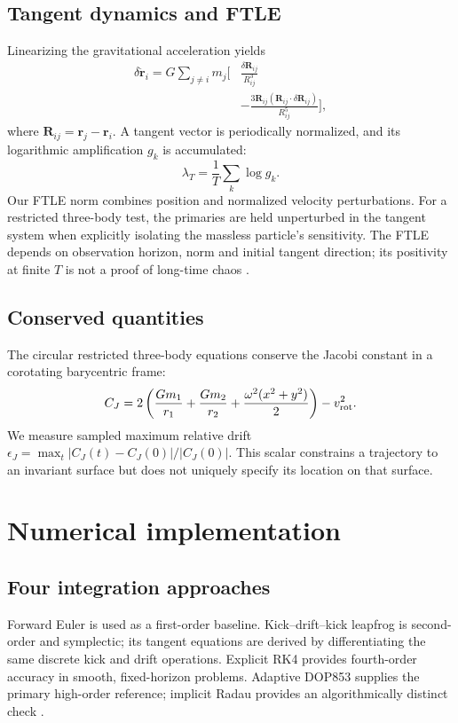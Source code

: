 \documentclass[10pt,letterpaper,twocolumn]{article}
\begin{document}
\subsection{Tangent dynamics and FTLE}
Linearizing the gravitational acceleration yields
\begin{align}
 \delta\ddot{\boldsymbol r}_i=G\sum_{j\ne i} m_j\bigg[&\frac{\delta\boldsymbol R_{ij}}{R_{ij}^3}\\[-.5em]
 &-\frac{3\boldsymbol R_{ij}(\boldsymbol R_{ij}\!\cdot\!\delta\boldsymbol R_{ij})}{R_{ij}^5}\bigg],\nonumber
\end{align}
where $\boldsymbol R_{ij}=\boldsymbol r_j-\boldsymbol r_i$. A tangent vector is periodically normalized, and its logarithmic amplification $g_k$ is accumulated:
\begin{equation}
 \lambda_T=\frac{1}{T}\sum_{k}\log g_k.
\end{equation}
Our FTLE norm combines position and normalized velocity perturbations. For a restricted three-body test, the primaries are held unperturbed in the tangent system when explicitly isolating the massless particle's sensitivity. The FTLE depends on observation horizon, norm and initial tangent direction; its positivity at finite $T$ is not a proof of long-time chaos \cite{benettin1980lyapunov1,benettin1980lyapunov2}.

\subsection{Conserved quantities}
The circular restricted three-body equations conserve the Jacobi constant in a corotating barycentric frame:
\begin{equation}
 C_J=2\left(\frac{Gm_1}{r_1}+\frac{Gm_2}{r_2}+\frac{\omega^2(x^2+y^2)}{2}\right)-v_{\rm rot}^2.
\end{equation}
We measure sampled maximum relative drift $\epsilon_J=\max_t|C_J(t)-C_J(0)|/|C_J(0)|$. This scalar constrains a trajectory to an invariant surface but does not uniquely specify its location on that surface.

\section{Numerical implementation}
\subsection{Four integration approaches}
Forward Euler is used as a first-order baseline. Kick--drift--kick leapfrog is second-order and symplectic; its tangent equations are derived by differentiating the same discrete kick and drift operations. Explicit RK4 provides fourth-order accuracy in smooth, fixed-horizon problems. Adaptive DOP853 supplies the primary high-order reference; implicit Radau provides an algorithmically distinct check \cite{hairer2006geometric,virtanen2020scipy}.
\end{document}
